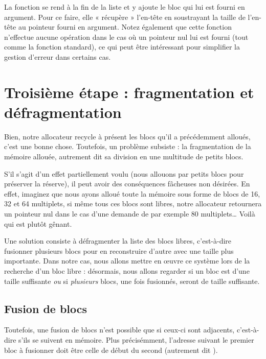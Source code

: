 La fonction  se rend à la fin de la liste et y
ajoute le bloc qui lui est fourni en argument. Pour ce faire, elle «
récupère » l'en-tête en soustrayant la taille de l'en-tête au pointeur
fourni en argument. Notez également que cette fonction n'effectue aucune
opération dans le cas où un pointeur nul lui est fourni (tout comme la
fonction  standard), ce qui peut être intéressant pour
simplifier la gestion d'erreur dans certains cas.

\section{Troisième étape : fragmentation et défragmentation}
\label{troisieme-etape-:-fragmentation-et-défragmentation}

Bien, notre allocateur recycle à présent les blocs qu'il a précédemment 
alloués, c'est une bonne chose. Toutefois, un problème subsiste : la 
fragmentation de la mémoire allouée, autrement dit sa division en une 
multitude de petits blocs.

S'il s'agit d'un effet partiellement voulu (nous allouons par petits
blocs pour préserver la réserve), il peut avoir des conséquences
fâcheuses non désirées. En effet, imaginez que nous ayons alloué toute
la mémoire sous forme de blocs de 16, 32 et 64 multiplets, si même tous
ces blocs sont libres, notre allocateur retournera un pointeur nul dans
le cas d'une demande de par exemple 80 multiplets\ldots{} Voilà qui est
plutôt gênant.

Une solution consiste à défragmenter la liste des blocs libres,
c'est-à-dire fusionner plusieurs blocs pour en reconstruire d'autre avec
une taille plus importante. Dans notre cas, nous allons mettre en œuvre
ce système lors de la recherche d'un bloc libre : désormais, nous allons
regarder si un bloc est d'une taille suffisante \emph{ou} si
\emph{plusieurs} blocs, une fois fusionnés, seront de taille suffisante.

\subsection{Fusion de blocs}
\label{fusion-de-blocs}

Toutefois, une fusion de blocs n'est possible que si ceux-ci sont
adjacents, c'est-à-dire s'ils se suivent en mémoire. Plus précisémment,
l'adresse suivant le premier bloc à fusionner doit être celle de début
du second (autrement dit
).

